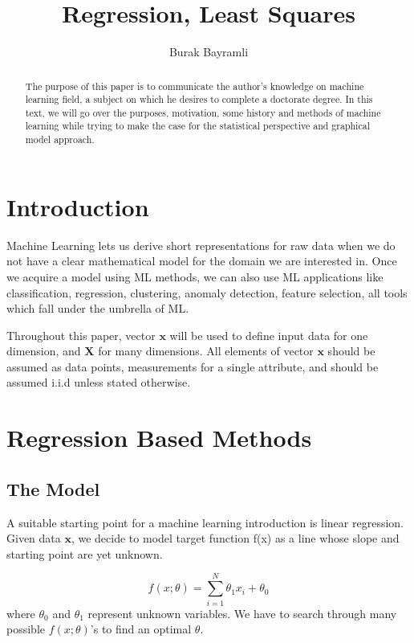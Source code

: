 \documentclass{ecctd01} %
\title{
Regression, Least Squares
}
\author{Burak Bayramli}
\begin{document}
\maketitle

\begin{abstract}
The purpose of this paper is to communicate the author's knowledge on
machine learning field, a subject on which he desires to complete a
doctorate degree. In this text, we will go over the purposes,
motivation, some history and methods of machine learning while trying
to make the case for the statistical perspective and graphical model
approach. 
\end{abstract}


\section{Introduction}
Machine Learning lets us derive short representations for raw data
when we do not have a clear mathematical model for the domain we are
interested in. Once we  acquire a model using ML methods, we can also
use ML applications like classification, regression, clustering,
anomaly detection, feature selection, all tools which fall under
the umbrella of ML. 

Throughout this paper, vector $\mathbf{x}$ will be used to define
input data for one dimension, and $\mathbf{X}$ for many 
dimensions. All elements of vector $\mathbf{x}$ should be assumed
as data points, measurements for a single attribute, and should be
assumed i.i.d unless stated otherwise.

\section{Regression Based Methods}
\subsection{The Model}
A suitable starting point for a machine learning introduction is linear
regression. Given data $\mathbf{x}$, we decide to model target
function f(x) as a line whose slope and starting point are yet unknown. 

\begin{equation}
  \label{eq:reg1}
  f(x;\theta) = \sum_{i=1}^N \theta_{1}x_{i} + \theta_{0}
\end{equation}
where $\theta_{0}$ and $\theta_{1}$ represent unknown variables. We
have to search through many possible $f(x;\theta)$'s to find an 
optimal $\theta$. 
\end{document}
